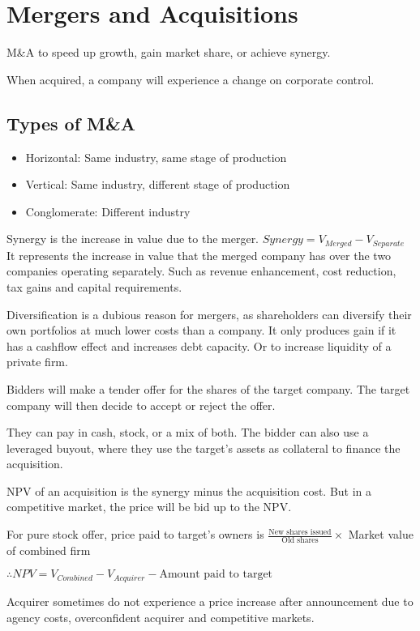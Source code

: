 \section{Mergers and Acquisitions}
M\&A to speed up growth, gain market share, or achieve synergy.

When acquired, a company will experience a change on corporate control.

\subsection{Types of M\&A}
\begin{itemize}
    \item Horizontal: Same industry, same stage of production
    \item Vertical: Same industry, different stage of production
    \item Conglomerate: Different industry
\end{itemize}

Synergy is the increase in value due to the merger.
$Synergy = V_{Merged} - V_{Separate}$
It represents the increase in value that the merged company has over the two companies operating separately. Such as revenue enhancement, cost reduction, tax gains and capital requirements.

Diversification is a dubious reason for mergers, as shareholders can diversify their own portfolios at much lower costs than a company.
It only produces gain if it has a cashflow effect and increases debt capacity. Or to increase liquidity of a private firm.

Bidders will make a tender offer for the shares of the target company. The target company will then decide to accept or reject the offer.

They can pay in cash, stock, or a mix of both. The bidder can also use a leveraged buyout, where they use the target's assets as collateral to finance the acquisition.

NPV of an acquisition is the synergy minus the acquisition cost. But in a competitive market, the price will be bid up to the NPV. 

For pure stock offer, price paid to target's owners is $\frac{\text{New shares issued}}{\text{Old shares}} \times$ Market value of combined firm

$\therefore NPV = V_{Combined} - V_{Acquirer} - \text{Amount paid to target}$

Acquirer sometimes do not experience a price increase after announcement due to agency costs, overconfident acquirer and competitive markets.

